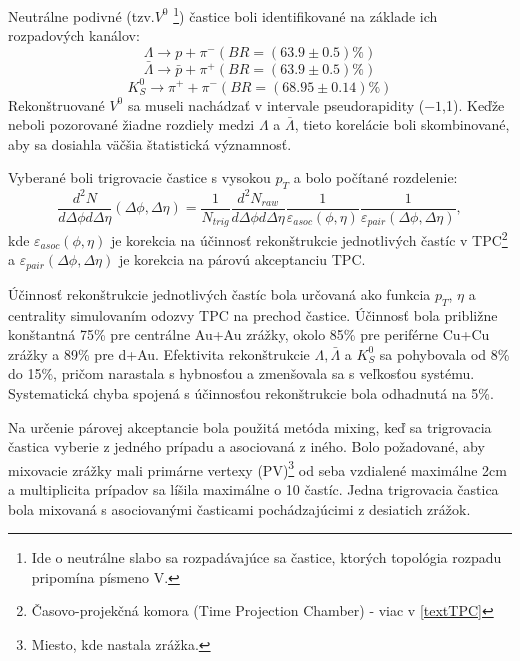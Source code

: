\documentclass[thesismargins, thesislinespacing]{rnthesis}
\begin{document}
Neutrálne podivné (tzv.$V^0$ \footnote{Ide o neutrálne slabo sa rozpadávajúce sa častice, ktorých topológia rozpadu pripomína písmeno V.}) častice boli identifikované na základe ich rozpadových kanálov:
\begin{equation}
\Lambda \rightarrow p + \pi^{-}  (BR=(63.9 \pm 0.5)\%)
\end{equation}
\begin{equation}
\bar{\Lambda} \rightarrow \bar{p} + \pi^{+}  (BR=(63.9 \pm 0.5)\%)
\end{equation}
\begin{equation}
K^0_S \rightarrow \pi^{+} + \pi^{-}  (BR=(68.95 \pm 0.14)\%)
\end{equation}
Rekonštruované $V^0$ sa museli nachádzať v intervale pseudorapidity ($-1$,1). Keďže neboli pozorované žiadne rozdiely medzi $\Lambda$ a $\bar{\Lambda}$, tieto korelácie boli skombinované, aby sa dosiahla väčšia štatistická významnosť.

Vyberané boli trigrovacie častice s vysokou $p_T$ a bolo počítané rozdelenie:
\begin{equation}
\frac{d^2N}{d\Delta \phi d\Delta \eta}(\Delta\phi,\Delta\eta) = \frac{1}{N_{trig}}\frac{d^2N_{raw}}{d\Delta \phi d\Delta \eta}\frac{1}{\varepsilon_{asoc}(\phi,\eta)}\frac{1}{\varepsilon_{pair}(\Delta\phi,\Delta\eta)},
\end{equation}
kde $\varepsilon_{asoc}(\phi,\eta)$ je korekcia na účinnosť rekonštrukcie jednotlivých častíc v TPC\footnote{Časovo-projekčná komora (Time Projection Chamber) - viac v \ref{textTPC}} a $\varepsilon_{pair}(\Delta\phi,\Delta\eta)$ je korekcia na párovú akceptanciu TPC. 

Účinnosť rekonštrukcie jednotlivých častíc bola určovaná ako funkcia $p_T$, $\eta$ a centrality simulovaním odozvy TPC na prechod častice. Účinnosť bola približne konštantná 75\% pre centrálne Au+Au zrážky, okolo 85\% pre periférne Cu+Cu zrážky a 89\% pre d+Au. Efektivita rekonštrukcie $\Lambda, \bar{\Lambda}$ a $K^0_S$ sa pohybovala od 8\% do 15\%, pričom narastala s hybnosťou a zmenšovala sa s veľkosťou systému. Systematická chyba spojená s účinnosťou rekonštrukcie bola odhadnutá na 5\%.

Na určenie párovej akceptancie bola použitá metóda mixing, keď sa trigrovacia častica vyberie z jedného prípadu a asociovaná z iného. Bolo požadované, aby mixovacie zrážky mali primárne vertexy (PV)\footnote{Miesto, kde nastala zrážka.} od seba vzdialené maximálne 2cm a multiplicita prípadov sa líšila maximálne o 10 častíc. Jedna trigrovacia častica bola mixovaná s asociovanými časticami pochádzajúcimi z desiatich zrážok.
\end{document}
